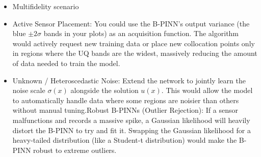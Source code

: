 \documentclass[11pt, a4paper]{article}
\begin{document}
\begin{itemize}
\item Multifidelity scenario
    \item Active Sensor Placement: You could use the B-PINN's output variance (the blue $\pm 2\sigma$ bands in your plots) as an acquisition function. The algorithm would actively request new training data or place new collocation points only in regions where the UQ bands are the widest, massively reducing the amount of data needed to train the model.
    \item Unknown / Heteroscedastic Noise: Extend the network to jointly learn the noise scale $\sigma(x)$ alongside the solution $u(x)$. This would allow the model to automatically handle data where some regions are noisier than others without manual tuning.Robust B-PINNs (Outlier Rejection): If a sensor malfunctions and records a massive spike, a Gaussian likelihood will heavily distort the B-PINN to try and fit it. Swapping the Gaussian likelihood for a heavy-tailed distribution (like a Student-t distribution) would make the B-PINN robust to extreme outliers.
\end{itemize}
\end{document}
